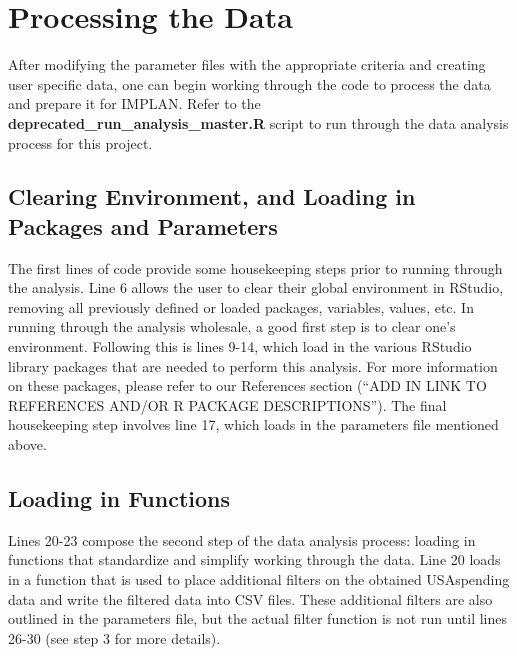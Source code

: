 \documentclass[
]{book}
\begin{document}
\hypertarget{processing-the-data}{%
\section{Processing the Data}\label{processing-the-data}}

After modifying the parameter files with the appropriate criteria and creating user specific data, one can begin working through the code to process the data and prepare it for IMPLAN. Refer to the \textbf{deprecated\_run\_analysis\_master.R} script to run through the data analysis process for this project.

\hypertarget{clearing-environment-and-loading-in-packages-and-parameters}{%
\subsection{Clearing Environment, and Loading in Packages and Parameters}\label{clearing-environment-and-loading-in-packages-and-parameters}}

The first lines of code provide some housekeeping steps prior to running through the analysis. Line 6 allows the user to clear their global environment in RStudio, removing all previously defined or loaded packages, variables, values, etc. In running through the analysis wholesale, a good first step is to clear one's environment. Following this is lines 9-14, which load in the various RStudio library packages that are needed to perform this analysis. For more information on these packages, please refer to our References section (``ADD IN LINK TO REFERENCES AND/OR R PACKAGE DESCRIPTIONS''). The final housekeeping step involves line 17, which loads in the parameters file mentioned above.

\hypertarget{loading-in-functions}{%
\subsection{Loading in Functions}\label{loading-in-functions}}

Lines 20-23 compose the second step of the data analysis process: loading in functions that standardize and simplify working through the data. Line 20 loads in a function that is used to place additional filters on the obtained USAspending data and write the filtered data into CSV files. These additional filters are also outlined in the parameters file, but the actual filter function is not run until lines 26-30 (see step 3 for more details).
\end{document}
